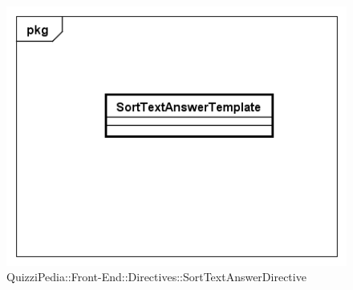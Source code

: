 		\label{QuizziPedia::Front-End::Directives::SortTextAnswerDirective}
		
		\begin{figure}[ht]
			\centering
			\includegraphics[scale=0.5,keepaspectratio]{UML/Classi/Front-End/QuizziPedia_Front-end_Templates_SortTextAnswerTemplate.png}
			\caption{QuizziPedia::Front-End::Directives::SortTextAnswerDirective}
		\end{figure} \FloatBarrier
		
